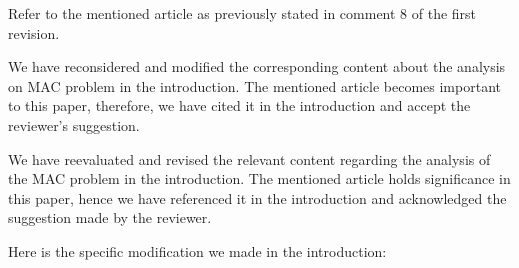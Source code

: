 \begin{revcomment}
  Refer to the mentioned article as previously stated in comment 8 of the first revision.
\end{revcomment}
\begin{revresponse}

We have reconsidered and modified the corresponding content about the analysis on MAC problem in the introduction. 
The mentioned article becomes important to this paper, therefore, we have cited it in the introduction and accept the reviewer's suggestion.


We have reevaluated and revised the relevant content regarding the analysis of the MAC problem in the introduction. The mentioned article holds significance in this paper, hence we have referenced it in the introduction and acknowledged the suggestion made by the reviewer.


Here is the specific modification we made in the introduction:
\begin{changes}
\end{changes}

\end{revresponse}

